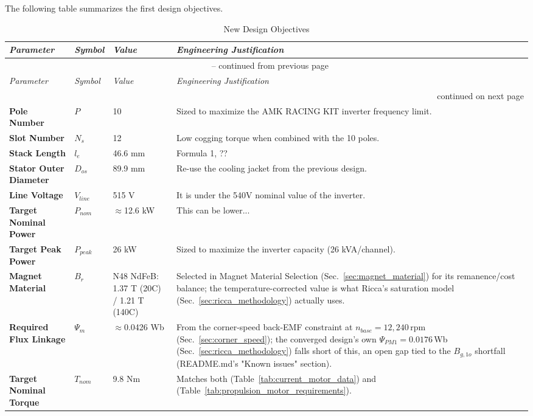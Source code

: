 \documentclass[11pt,a4paper]{article}
\begin{document}
The following table summarizes the first design objectives.
\begin{center}
\begin{longtable}{p{2.6cm} p{1.1cm} p{2.7cm} p{8.2cm}}
\caption{New Design Objectives}
\label{tab:motor_design_data} \\
\hline
\textit{Parameter} & \textit{Symbol} & \textit{Value} & \textit{Engineering Justification} \\ \hline
\endfirsthead
\multicolumn{4}{c}{\tablename\ \thetable{} -- continued from previous page} \\
\hline
\textit{Parameter} & \textit{Symbol} & \textit{Value} & \textit{Engineering Justification} \\ \hline
\endhead
\hline \multicolumn{4}{r}{continued on next page} \\
\endfoot
\hline
\endlastfoot
\textbf{Pole Number} & $P$ & 10 & Sized to maximize the AMK RACING KIT inverter frequency limit. \\
\textbf{Slot Number} & $N_s$ & 12 & Low cogging torque when combined with the 10 poles. \\
\textbf{Stack Length} & $l_e$ & 46.6 mm & Formula 1, ?? \\
\textbf{Stator Outer Diameter} & $D_{os}$ & 89.9 mm & Re-use the cooling jacket from the previous design. \\
\textbf{Line Voltage} & $V_{line}$ & 515 V & It is under the 540V nominal value of the inverter. \\
\textbf{Target Nominal Power} & $P_{nom}$ & $\approx$12.6 kW & This can be lower... \\
\textbf{Target Peak Power} & $P_{peak}$ & 26 kW & Sized to maximize the inverter capacity (26 kVA/channel). \\
\textbf{Magnet Material} & $B_r$ & N48 NdFeB: 1.37 T (20\textdegree{}C) / 1.21 T (140\textdegree{}C) & Selected in Magnet Material Selection (Sec.~\ref{sec:magnet_material}) for its remanence/cost balance; the temperature-corrected value is what Ricca's saturation model (Sec.~\ref{sec:ricca_methodology}) actually uses. \\
\textbf{Required Flux Linkage} & $\Psi_m$ & $\approx$0.0426 Wb & From the corner-speed back-EMF constraint at $n_{base}=12{,}240\,\text{rpm}$ (Sec.~\ref{sec:corner_speed}); the converged design's own $\Psi_{PM1}=0.0176$\,Wb (Sec.~\ref{sec:ricca_methodology}) falls short of this, an open gap tied to the $B_{g,1o}$ shortfall (README.md's "Known issues" section). \\
\textbf{Target Nominal Torque} & $T_{nom}$ & 9.8 Nm & Matches both (Table~\ref{tab:current_motor_data}) and (Table~\ref{tab:propulsion_motor_requirements}). \\

\end{longtable}
\end{center}
\end{document}
